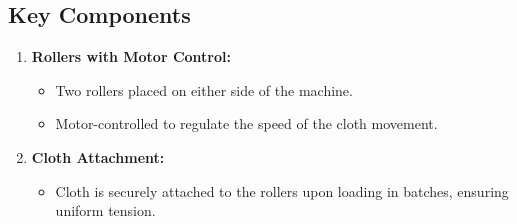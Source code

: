 \documentclass[table,french,english]{rapportCS}
\begin{document}
\subsection{Key Components}
\begin{enumerate}[label=\arabic*.]

    \item \textbf{Rollers with Motor Control:}
    \begin{itemize}[label=$\bullet$]
        \item Two rollers placed on either side of the machine.
        \item Motor-controlled to regulate the speed of the cloth movement.
    \end{itemize}

    \item \textbf{Cloth Attachment:}
    \begin{itemize}[label=$\bullet$]
        \item Cloth is securely attached to the rollers upon loading in batches, ensuring uniform tension.
    \end{itemize}


\end{enumerate}
\end{document}
